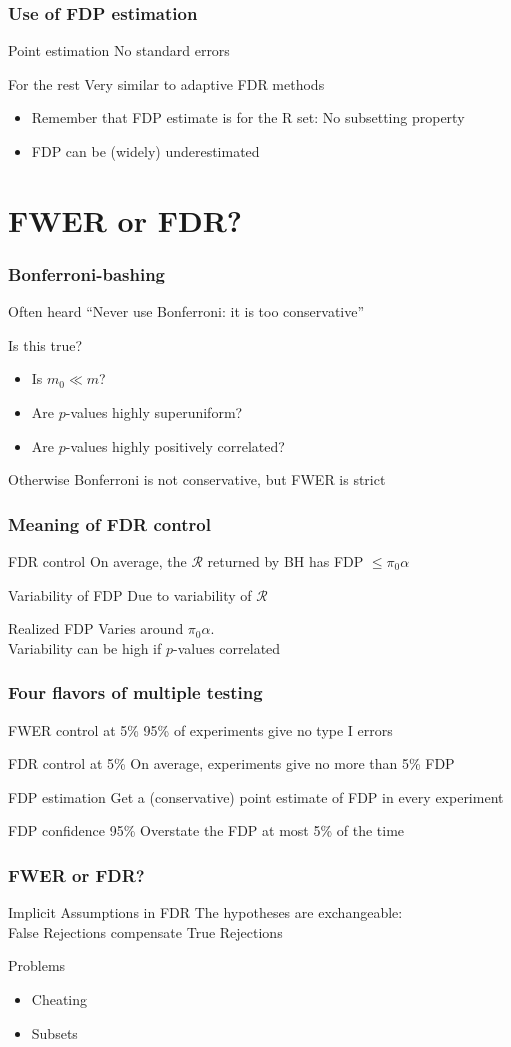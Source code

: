 \documentclass[xcolor={pdftex,dvipsnames,table}]{beamer}
\newcommand{\bb}[1]{\begin{block}{#1}}
\newcommand{\eb}{\end{block}}
\newcommand{\bi}{\begin {itemize}}
\newcommand{\ei}{\end{itemize}}
\newcommand{\bfr}[1]{\begin{frame} \frametitle{#1}}
\begin{document}
\bfr{Use of FDP estimation}
  \bb{Point estimation}
    No standard errors
  \eb
  \bb{For the rest}
    Very similar to adaptive FDR methods
    \bi
       \item Remember that FDP estimate is for the R set: No subsetting property
      \item FDP can be (widely) underestimated
    \ei
  \eb
\end{frame}


\section{FWER or FDR?}

\bfr{Bonferroni-bashing}
  \bb{Often heard}
    ``Never use Bonferroni: it is too conservative''
  \eb
  \bb{Is this true?}
    \bi
      \item Is $m_0 \ll m$?
      \item Are $p$-values highly superuniform?
      \item Are $p$-values highly positively correlated?
    \ei
  \eb
  \bb{Otherwise}
    Bonferroni is not conservative, but FWER is strict
  \eb
\end{frame}

\bfr{Meaning of FDR control}
  \bb{FDR control}
    On average, the $\mathcal{R}$ returned by BH has FDP $\leq\pi_0\alpha$
  \eb
  \bb{Variability of FDP}
    Due to variability of $\mathcal{R}$
  \eb
  \bb{Realized FDP}
    Varies around $\pi_0\alpha$.
    \\ Variability can be high if $p$-values correlated
  \eb
\end{frame}

\bfr{Four flavors of multiple testing}
  \bb{FWER control at 5\%}
    95\% of experiments give no type I errors
  \eb
  \bb{FDR control at 5\%}
    On average, experiments give no more than 5\% FDP
  \eb
  \bb{FDP estimation}
    Get a (conservative) point estimate of FDP in every experiment
  \eb
  \bb{FDP confidence 95\%}
    Overstate the FDP at most 5\% of the time
  \eb
\end{frame}

\bfr{FWER or FDR?}
  \bb{Implicit Assumptions in FDR}
    The hypotheses are exchangeable:
    \\ False Rejections compensate True Rejections
  \eb
  \pause
  \bb{Problems}
    \bi
     \item Cheating 
     \item Subsets
    \ei
  \eb
\end{frame}
\end{document}
